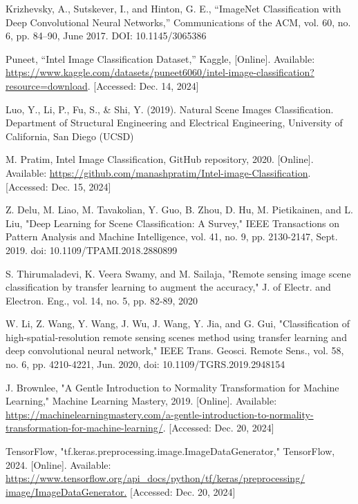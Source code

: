 \documentclass[conference]{IEEEtran}
\begin{document}
\begin{thebibliography}{00}

 Krizhevsky, A., Sutskever, I., and Hinton, G. E., “ImageNet Classification with Deep Convolutional Neural Networks,” Communications of the ACM, vol. 60, no. 6, pp. 84–90, June 2017. DOI: 10.1145/3065386

 Puneet, “Intel Image Classification Dataset,” Kaggle, [Online]. Available: \url{https://www.kaggle.com/datasets/puneet6060/intel-image-classification?resource=download}. [Accessed: Dec. 14, 2024]

 Luo, Y., Li, P., Fu, S., \& Shi, Y. (2019). Natural Scene Images Classification.
Department of Structural Engineering and Electrical Engineering, University of California, San Diego (UCSD)

 M. Pratim, Intel Image Classification, GitHub repository, 2020. [Online]. Available: \url{https://github.com/manashpratim/Intel-image-Classification}. [Accessed: Dec. 15, 2024]

 Z. Delu, M. Liao, M. Tavakolian, Y. Guo, B. Zhou, D. Hu, M. Pietikainen, and L. Liu, "Deep Learning for Scene Classification: A Survey," IEEE Transactions on Pattern Analysis and Machine Intelligence, vol. 41, no. 9, pp. 2130-2147, Sept. 2019. doi: 10.1109/TPAMI.2018.2880899

 S. Thirumaladevi, K. Veera Swamy, and M. Sailaja, "Remote sensing image scene classification by transfer learning to augment the accuracy," J. of Electr. and Electron. Eng., vol. 14, no. 5, pp. 82-89, 2020

 W. Li, Z. Wang, Y. Wang, J. Wu, J. Wang, Y. Jia, and G. Gui, "Classification of high-spatial-resolution remote sensing scenes method using transfer learning and deep convolutional neural network," IEEE Trans. Geosci. Remote Sens., vol. 58, no. 6, pp. 4210-4221, Jun. 2020, doi: 10.1109/TGRS.2019.2948154

 J. Brownlee, "A Gentle Introduction to Normality Transformation for Machine Learning," Machine Learning Mastery, 2019. [Online]. Available: \url{https://machinelearningmastery.com/a-gentle-introduction-to-normality-transformation-for-machine-learning/}. [Accessed: Dec. 20, 2024]

TensorFlow, "tf.keras.preprocessing.image.ImageDataGenerator," TensorFlow, 2024. [Online]. Available: \url{https://www.tensorflow.org/api\_docs/python/tf/keras/preprocessing/ image/ImageDataGenerator.} [Accessed: Dec. 20, 2024]


\end{thebibliography}
\end{document}
